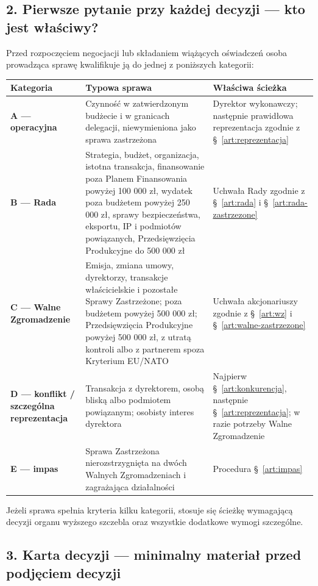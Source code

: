 \documentclass[12pt,a4paper]{report}
\begin{document}
\subsection*{2. Pierwsze pytanie przy każdej decyzji — kto jest właściwy?}

Przed rozpoczęciem negocjacji lub składaniem wiążących oświadczeń osoba prowadząca sprawę kwalifikuje ją do jednej z poniższych kategorii:

\begin{center}
\small
\begin{tabularx}{\textwidth}{>{\bfseries}p{3.0cm} X X}
\toprule
Kategoria & Typowa sprawa & Właściwa ścieżka \\
\midrule
A — operacyjna & Czynność w zatwierdzonym budżecie i w granicach delegacji, niewymieniona jako sprawa zastrzeżona & Dyrektor wykonawczy; następnie prawidłowa reprezentacja zgodnie z §~\ref{art:reprezentacja} \\
B — Rada & Strategia, budżet, organizacja, istotna transakcja, finansowanie poza Planem Finansowania powyżej 100 000 zł, wydatek poza budżetem powyżej 250 000 zł, sprawy bezpieczeństwa, eksportu, IP i podmiotów powiązanych, Przedsięwzięcia Produkcyjne do 500 000 zł & Uchwała Rady zgodnie z §~\ref{art:rada} i §~\ref{art:rada-zastrzezone} \\
C — Walne Zgromadzenie & Emisja, zmiana umowy, dyrektorzy, transakcje właścicielskie i pozostałe Sprawy Zastrzeżone; poza budżetem powyżej 500 000 zł; Przedsięwzięcia Produkcyjne powyżej 500 000 zł, z utratą kontroli albo z partnerem spoza Kryterium EU/NATO & Uchwała akcjonariuszy zgodnie z §~\ref{art:wz} i §~\ref{art:walne-zastrzezone} \\
D — konflikt / szczególna reprezentacja & Transakcja z dyrektorem, osobą bliską albo podmiotem powiązanym; osobisty interes dyrektora & Najpierw §~\ref{art:konkurencja}, następnie §~\ref{art:reprezentacja}; w razie potrzeby Walne Zgromadzenie \\
E — impas & Sprawa Zastrzeżona nierozstrzygnięta na dwóch Walnych Zgromadzeniach i zagrażająca działalności & Procedura §~\ref{art:impas} \\
\bottomrule
\end{tabularx}
\end{center}

Jeżeli sprawa spełnia kryteria kilku kategorii, stosuje się ścieżkę wymagającą decyzji organu wyższego szczebla oraz wszystkie dodatkowe wymogi szczególne.

\subsection*{3. Karta decyzji — minimalny materiał przed podjęciem decyzji}
\end{document}
